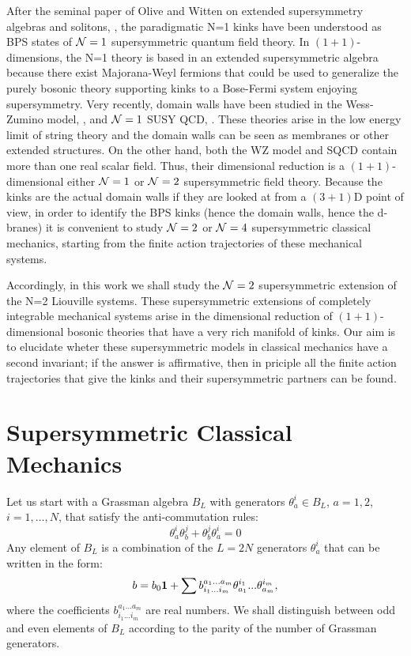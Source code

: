 \documentclass[a4paper,11pt,twoside]{article}
\begin{document}
After the seminal paper of Olive and Witten on extended
supersymmetry algebras and solitons, \cite{Oliv}, the paradigmatic
N=1 kinks have been understood as BPS states of ${\cal N}=1$
supersymmetric quantum field theory. In $(1+1)$-dimensions, the
N=1 theory is based in an extended supersymmetric algebra because
there exist Majorana-Weyl fermions that could be used to
generalize the purely bosonic theory supporting kinks to a
Bose-Fermi system enjoying supersymmetry. Very recently, domain
walls have been studied in the Wess-Zumino model, \cite{Gibb}, and
${\cal N}=1$ SUSY QCD, \cite{Vali}. These theories arise in the
low energy limit of string theory and the domain walls can be seen
as membranes or other extended structures. On the other hand, both
the WZ model and SQCD contain more than one real scalar field.
Thus, their dimensional reduction is a $(1+1)$-dimensional either
${\cal N}=1$ or ${\cal N}=2$ supersymmetric field theory. Because
the kinks are the actual domain walls if they are looked at from a
$(3+1)$D point of view, in order to identify the BPS kinks (hence
the domain walls, hence the d-branes) it is convenient to study
${\cal N}=2$ or ${\cal N}=4$ supersymmetric classical mechanics,
starting from the finite action trajectories of these mechanical
systems.

Accordingly, in this work we shall study the ${\cal N}=2$
supersymmetric extension of the N=2 Liouville systems. These
supersymmetric extensions of completely integrable mechanical
systems arise in the dimensional reduction of $(1+1)$-dimensional
bosonic theories that have a very rich manifold of kinks. Our aim
is to elucidate wheter these supersymmetric models in classical
mechanics have a second invariant; if the answer is affirmative,
then in priciple all the finite action trajectories that give the
kinks and their supersymmetric partners can be found.

\section{Supersymmetric Classical Mechanics}

Let us start with a Grassman algebra $B_L$ with generators
$\theta_a^i \in B_L$, $a=1,2$, $i=1, \ldots ,N$,  that satisfy the
anti-commutation rules:
\[
\theta_a^i \theta_b^j + \theta_b^j \theta_a^i=0
\]
Any element of $B_L$ is a combination of the $L=2N$
generators $\theta_a^i$ that can be written in the form:
\[
b=b_0 {\bf 1}+\sum b_{i_1...i_m}^{a_1...a_m}
\theta_{a_1}^{i_1}...\theta_{a_m}^{i_m},
\]
where the coefficients $b_{i_1...i_m}^{a_1...a_m}$ are real
numbers. We shall distinguish between odd and even elements of
$B_L$ according to the parity of the number of Grassman
generators.
\end{document}
